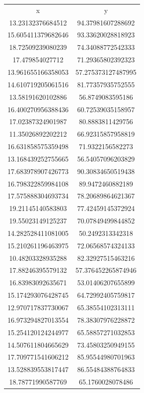 \begin{table}
\begin{tabular}{cc}
x & y \\
13.23132376684512 & 94.37981607288692 \\
15.605411379682646 & 93.33620028818923 \\
18.72509239080239 & 74.34088772542333 \\
17.479854027712 & 71.29365802392323 \\
13.961655166358053 & 57.275373127487995 \\
14.610719205061516 & 81.77357935752555 \\
13.58191620102886 & 56.8749083595186 \\
16.400270956388436 & 60.72539035158957 \\
17.02387324901987 & 80.8883811429756 \\
11.35026892202212 & 66.92315857958819 \\
16.631858575359498 & 71.9322156582273 \\
13.168439252755665 & 56.54057096203829 \\
17.683978907426773 & 90.30834650519438 \\
16.798322859984108 & 89.9472460882189 \\
17.575888304693734 & 78.20689864621367 \\
19.21145140583803 & 77.42459145372924 \\
19.55023149125237 & 70.07849499844852 \\
14.282528411081005 & 50.2492313342318 \\
15.210261196463975 & 72.06568574324133 \\
10.48203328935288 & 82.32927515463216 \\
17.88246395579132 & 57.376452265874946 \\
16.83983092635671 & 53.01406207655899 \\
15.174293076428745 & 64.72992405759817 \\
12.970717837730067 & 65.38554102313111 \\
16.973294827013554 & 78.38307976228872 \\
15.254120124244977 & 65.58857271032853 \\
14.507611804665629 & 73.45803250949155 \\
17.709771541606212 & 85.95544980701963 \\
13.528839553817447 & 86.55484388764833 \\
18.78771990587769 & 65.1760028078486 \\

\end{tabular}
\end{table}
